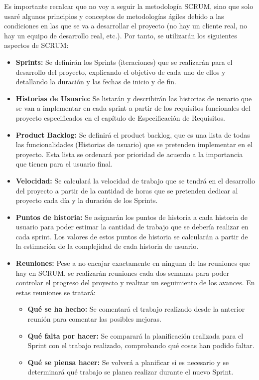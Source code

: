 Es importante recalcar que no voy a seguir la metodología SCRUM, sino que solo usaré algunos principios y
conceptos de metodologías ágiles debido a las condiciones en las que se va a desarrollar el proyecto
(no hay un cliente real, no hay un equipo de desarrollo real, etc.). Por tanto, se utilizarán los siguientes aspectos de SCRUM:
\begin{itemize}
    \item \textbf{Sprints:} Se definirán los Sprints (iteraciones) que se realizarán para el desarrollo del proyecto, explicando
          el objetivo de cada uno de ellos y detallando la duración y las fechas de inicio y de fin.
    \item \textbf{Historias de Usuario:} Se listarán y describirán las historias de usuario que se van a implementar en cada sprint a partir
          de los requisitos funcionales del proyecto especificados en el capítulo de Especificación de Requisitos.
    \item \textbf{Product Backlog: }Se definirá el product backlog, que es una lista de todas las funcionalidades (Historias de usuario) que se
          pretenden implementar en el proyecto. Esta lista se ordenará por prioridad de acuerdo a la importancia que tienen para el usuario final.
    \item \textbf{Velocidad:} Se calculará la velocidad de trabajo que se tendrá en el desarrollo del proyecto a partir de la cantidad de horas
          que se pretenden dedicar al proyecto cada día y la duración de los Sprints.
    \item \textbf{Puntos de historia: }Se asignarán los puntos de historia a cada historia de usuario para poder estimar la cantidad de trabajo
          que se debería realizar en cada sprint. Los valores de estos puntos de historia se calcularán a partir de la estimación de la complejidad de cada historia de usuario.
    \item \textbf{Reuniones: }Pese a no encajar exactamente en ninguna de las reuniones que hay en SCRUM, se realizarán reuniones cada dos semanas para
          poder controlar el progreso del proyecto y realizar un seguimiento de los avances. En estas reuniones se tratará:
            \begin{itemize}
                \item \textbf{Qué se ha hecho:} Se comentará el trabajo realizado desde la anterior reunión para comentar las posibles mejoras.
                \item \textbf{Qué falta por hacer: }Se comparará la planificación realizada para el Sprint con el trabajo realizado, comprobando qué cosas han podido faltar.
                \item \textbf{Qué se piensa hacer: }Se volverá a planificar si es necesario y se determinará qué trabajo se planea realizar durante el nuevo Sprint.
            \end{itemize}
\end{itemize}



